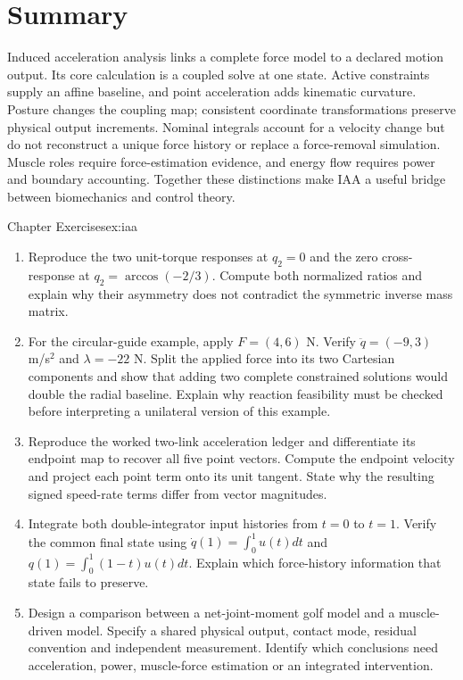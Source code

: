 \section{Summary}
\label{sec:iaa_summary}
Induced acceleration analysis links a complete force model to a declared motion output. Its core calculation is a coupled solve at one state. Active constraints supply an affine baseline, and point acceleration adds kinematic curvature. Posture changes the coupling map; consistent coordinate transformations preserve physical output increments. Nominal integrals account for a velocity change but do not reconstruct a unique force history or replace a force-removal simulation. Muscle roles require force-estimation evidence, and energy flow requires power and boundary accounting. Together these distinctions make IAA a useful bridge between biomechanics and control theory.



\begin{exercises}{Chapter Exercises}{ex:iaa}
\begin{enumerate}
\item Reproduce the two unit-torque responses at \(q_2=0\) and the zero cross-response at \(q_2=\arccos(-2/3)\). Compute both normalized ratios and explain why their asymmetry does not contradict the symmetric inverse mass matrix.
\item For the circular-guide example, apply \(F=(4,6)\) N. Verify \(\ddot q=(-9,3)\) m/s\(^2\) and \(\lambda=-22\) N. Split the applied force into its two Cartesian components and show that adding two complete constrained solutions would double the radial baseline. Explain why reaction feasibility must be checked before interpreting a unilateral version of this example.
\item Reproduce the worked two-link acceleration ledger and differentiate its endpoint map to recover all five point vectors. Compute the endpoint velocity and project each point term onto its unit tangent. State why the resulting signed speed-rate terms differ from vector magnitudes.
\item Integrate both double-integrator input histories from \(t=0\) to \(t=1\). Verify the common final state using \(\dot q(1)=\int_0^1u(t)dt\) and \(q(1)=\int_0^1(1-t)u(t)dt\). Explain which force-history information that state fails to preserve.
\item Design a comparison between a net-joint-moment golf model and a muscle-driven model. Specify a shared physical output, contact mode, residual convention and independent measurement. Identify which conclusions need acceleration, power, muscle-force estimation or an integrated intervention.
\end{enumerate}
\end{exercises}
\flushbottom{}
